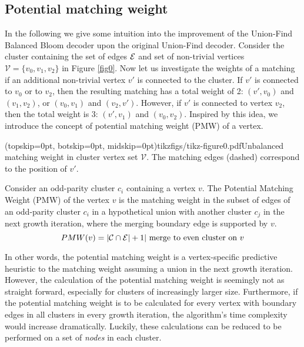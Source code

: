 \subsection{Potential matching weight}\label{sec:matchingweight}

In the following we give some intuition into the improvement of the Union-Find Balanced Bloom decoder upon the original Union-Find decoder. Consider the cluster containing the set of edges $\mathcal{E}$ and set of non-trivial vertices $\mathcal{V}=\{v_0,v_1,v_2\}$ in Figure \ref{fig0}. Now let us investigate the weights of a matching if an additional non-trivial vertex $v'$ is connected to the cluster. If $v'$ is connected to $v_0$ or to $v_2$, then the resulting matching has a total weight of 2: $(v',v_0)$ and $(v_1,v_2)$, or $(v_0,v_1)$ and $(v_2,v')$. However, if $v'$ is connected to vertex $v_2$, then the total weight is 3: $(v', v_1)$ and $(v_0, v_2)$. Inspired by this idea, we introduce the concept of potential matching weight (PMW) of a vertex. 

\Figure[htb](topskip=0pt, botskip=0pt, midskip=0pt){tikzfigs/tikz-figure0.pdf}{Unbalanced matching weight in cluster vertex set $\mathcal{V}$. The matching edges (dashed) correspond to the position of $v'$.\label{fig0}}

\begin{definition}\label{def:pmw}
    Consider an odd-parity cluster $c_i$ containing a vertex $v$. The Potential Matching Weight (PMW) of the vertex $v$ is the matching weight in the subset of edges of an odd-parity cluster $c_i$ in a hypothetical union with another cluster $c_j$ in the next growth iteration, where the merging boundary edge is supported by $v$. 
    \begin{equation}
      PMW(v) = \lvert\mathcal{C} \cap \mathcal{E}\rvert + 1 |\text{ merge to even cluster on } v
    \end{equation}
\end{definition}
In other words, the potential matching weight is a vertex-specific predictive heuristic to the matching weight assuming a union in the next growth iteration. However, the calculation of the potential matching weight is seemingly not as straight forward, especially for clusters of increasingly larger size. Furthermore, if the potential matching weight is to be calculated for every vertex with boundary edges in all clusters in every growth iteration, the algorithm's time complexity would increase dramatically. Luckily, these calculations can be reduced to be performed on a set of \emph{nodes} in each cluster. 


